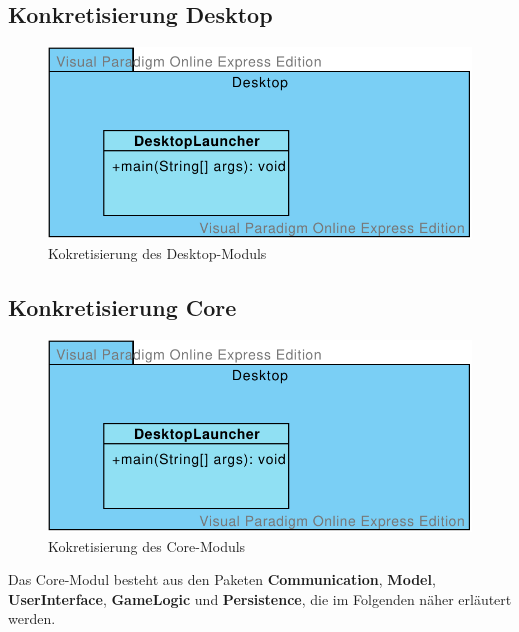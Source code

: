 \documentclass[enabledeprecatedfontcommands,fontsize=12pt,paper=a4,twoside,parskip=half]{scrartcl}
\begin{document}
\subsection{Konkretisierung Desktop}

\label{subsec:desktop}

\begin{figure}[H]
    \centering
    \includegraphics[width=.5\textwidth]{Bilder/Desktop-Modul.pdf}
    \caption{Kokretisierung des Desktop-Moduls}
    \label{fig:desktopModul}
\end{figure}



\subsection{Konkretisierung Core}
\label{subsec:core}

\begin{figure}[H]
    \centering
    \includegraphics[width=.5\textwidth]{Bilder/Desktop-Modul.pdf}
    \caption{Kokretisierung des Core-Moduls}
    \label{fig:coreModul}
\end{figure}

Das Core-Modul besteht aus den Paketen \textbf{Communication}, \textbf{Model}, \textbf{UserInterface}, \textbf{GameLogic} und \textbf{Persistence}, die im Folgenden näher erläutert werden.



\end{document}
